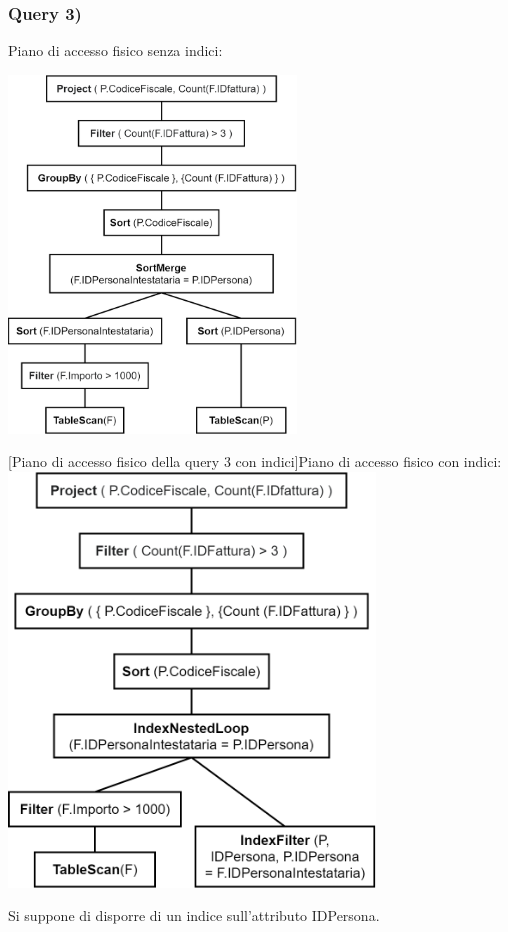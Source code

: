 \documentclass[a4paper,12pt]{article}
\begin{document}
 \subsubsection{ Query 3) }

\vspace{-0.3cm}\hspace{-1cm}
\begin{minipage}{\textwidth}
\begin{multicols}{2}

\null \vfill
Piano di accesso fisico senza indici:

\vspace{0.3cm}\includegraphics[height=9.5cm]{ Albero fisico 3.png }
\vfill \null

\columnbreak

 [Piano di accesso fisico della query 3 con indici]{Piano di accesso fisico con indici:}
\includegraphics[height=11cm]{ Albero fisico indici 3.png }

Si suppone di disporre di un indice sull'attributo IDPersona.

\end{multicols}
\end{minipage}
\end{document}
